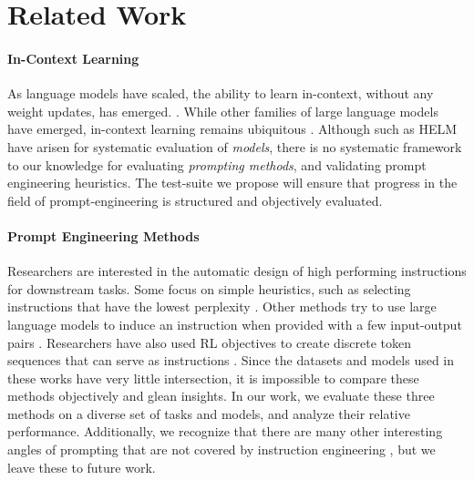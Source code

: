 \section{Related Work}
\iffalse
\paragraph{In-Context Learning} As language models have scaled, the ability to learn in-context, without any weight updates, has emerged. \cite{brown2020language}. While other families of large language models have emerged, in-context learning remains ubiquitous \cite{llama, bloom, gptneo, opt}. Although such as HELM \cite{helm} have arisen for systematic evaluation of \emph{models}, there is no systematic framework to our knowledge for evaluating \emph{prompting methods}, and validating prompt engineering heuristics. The test-suite we propose will ensure that progress in the field of prompt-engineering is structured and objectively evaluated. 

\paragraph{Prompt Engineering Methods} Researchers are interested in the automatic design of high performing instructions for downstream tasks. Some focus on simple heuristics, such as selecting instructions that have the lowest perplexity \cite{lowperplexityprompts}. Other methods try to use large language models to induce an instruction when provided with a few input-output pairs \cite{ape}. Researchers have also used RL objectives to create discrete token sequences that can serve as instructions \cite{rlprompt}. Since the datasets and models used in these works have very little intersection, it is impossible to compare these methods objectively and glean insights. In our work, we evaluate these three methods on a diverse set of tasks and models, and analyze their relative performance. Additionally, we recognize that there are many other interesting angles of prompting that are not covered by instruction engineering \cite{weichain, react, selfconsistency}, but we leave these to future work.

